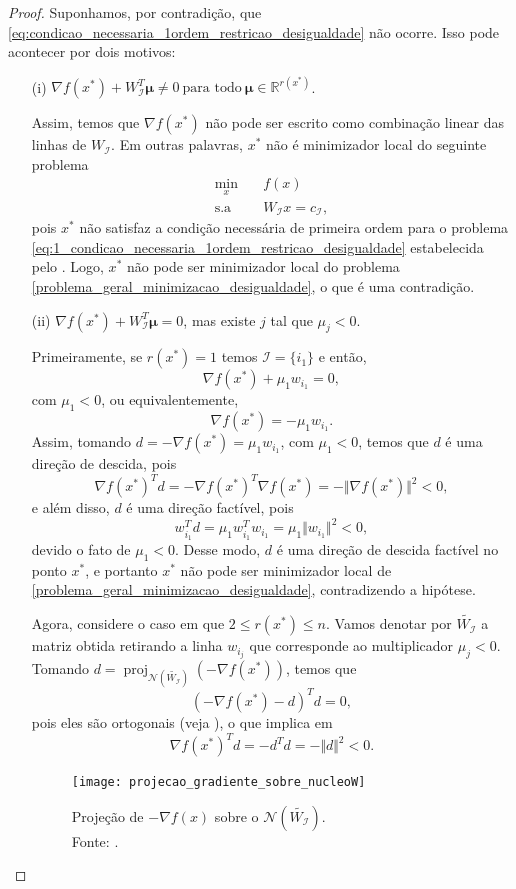 \documentclass[12pt,a4paper]{scrartcl}
\DeclareMathOperator{\proj}{proj}
\def\RR{\mathds{R}}
\theoremstyle{definition}%
\begin{document}
\begin{proof}
Suponhamos, por contradição, que \eqref{eq:condicao_necessaria_1ordem_restricao_desigualdade} não ocorre. Isso pode acontecer por dois motivos:
\begin{enumerate}
\item[(i)] $\nabla f(x^{*}) + W_{\mathcal{I}}^{T} \boldsymbol{\mu} \neq 0 \ \text{para todo} \ \boldsymbol{\mu} \in \RR^{r(x^{*})}$.

Assim, temos que $\nabla f(x^{*})$ não pode ser escrito como combinação linear das linhas de $W_{\mathcal{I}}$. Em outras palavras, $x^{*}$ não é minimizador local do seguinte problema
\[ \label{eq:1_condicao_necessaria_1ordem_restricao_desigualdade}
\begin{aligned}
\min_{x} & \quad f(x) \\
\text{s.a} & \quad W_{\mathcal{I}}x=c_{\mathcal{I}} ,
\end{aligned}
\]
pois $x^{*}$ não satisfaz a condição necessária de primeira ordem para o problema \eqref{eq:1_condicao_necessaria_1ordem_restricao_desigualdade} estabelecida pelo . Logo, $x^{*}$ não pode ser minimizador local do problema \eqref{problema_geral_minimizacao_desigualdade}, o que é uma contradição.

\item[(ii)] $\nabla f(x^{*}) + W_{\mathcal{I}}^{T} \boldsymbol{\mu} = 0$, mas existe $j$ tal que $\mu_{j} <0$.

Primeiramente, se $r(x^{*}) = 1$ temos $\mathcal{I} = \{ i_{1} \}$ e então, 
\[
\nabla f(x^{*}) + \mu_{1} w_{i_{1}} =0 ,
\]
com $\mu_{1} <0$, ou equivalentemente, 
\[
\nabla f(x^{*}) = - \mu_{1} w_{i_{1}} .
\]
Assim, tomando $d=-\nabla f(x^{*}) = \mu_{1} w_{i_{1}}$, com $\mu_{1} <0$, temos que $d$ é uma direção de descida, pois
\[
\nabla f(x^{*})^{T}d = -\nabla f(x^{*})^{T} \nabla f(x^{*}) = -\Vert \nabla f(x^{*}) \Vert^{2} <0,
\]
e além disso, $d$ é uma direção factível, pois
\[
w_{i_{1}}^{T}d = \mu_{1} w_{i_{1}}^{T}w_{i_{1}} = \mu_{1} \Vert w_{i_{1}} \Vert^{2} < 0,
\]
devido o fato de $\mu_{1} <0$. Desse modo, $d$ é uma direção de descida factível no ponto $x^{*}$, e portanto $x^{*}$ não pode ser minimizador local de \eqref{problema_geral_minimizacao_desigualdade}, contradizendo a hipótese.

Agora, considere o caso em que $2\leq r(x^{*}) \leq n$. Vamos denotar por $\tilde{W_{\mathcal{I}}}$ a matriz obtida retirando a linha $w_{i_{j}}$ que corresponde ao multiplicador $\mu_{j} <0$. Tomando $d=\proj_{\mathcal{N}(\tilde{W_{\mathcal{I}}})} (-\nabla f(x^{*}))$, temos que
\[
(-\nabla f(x^{*}) -d)^{T}d =0,
\]
pois eles são ortogonais (veja ), o que implica em
\[ \label{eq:2_condicao_necessaria_1ordem_restricao_desigualdade}
\nabla f(x^{*})^{T}d = -d^{T}d = -\Vert d \Vert^{2} <0. \]
\begin{figure}[!ht] 
	\centering
	\texttt{[image: projecao\_gradiente\_sobre\_nucleoW]}
	\caption{Projeção de $-\nabla f(x)$ sobre o $\mathcal{N}(\tilde{W_{\mathcal{I}}})$. \\ Fonte: \textcite{Ana1994}. \label{fig:projecao_gradiente_sobre_nucleoA}}
\end{figure}


\end{enumerate}
\end{proof}
\end{document}
